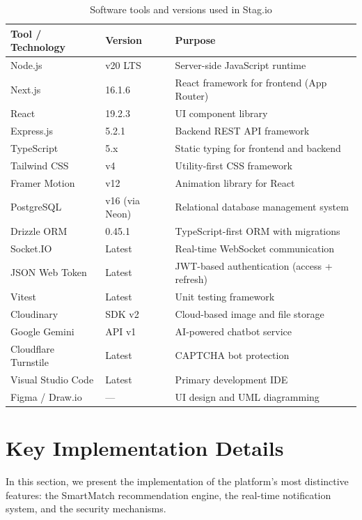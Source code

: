 \begin{table}[H]
\centering
\caption{Software tools and versions used in Stag.io}
\label{tab:software}
\begin{tabular}{|p{3.5cm}|p{2.5cm}|p{7.5cm}|}
\hline
\textbf{Tool / Technology} & \textbf{Version} & \textbf{Purpose} \\
\hline
Node.js & v20 LTS & Server-side JavaScript runtime \\
\hline
Next.js & 16.1.6 & React framework for frontend (App Router) \\
\hline
React & 19.2.3 & UI component library \\
\hline
Express.js & 5.2.1 & Backend REST API framework \\
\hline
TypeScript & 5.x & Static typing for frontend and backend \\
\hline
Tailwind CSS & v4 & Utility-first CSS framework \\
\hline
Framer Motion & v12 & Animation library for React \\
\hline
PostgreSQL & v16 (via Neon) & Relational database management system \\
\hline
Drizzle ORM & 0.45.1 & TypeScript-first ORM with migrations \\
\hline
Socket.IO & Latest & Real-time WebSocket communication \\
\hline
JSON Web Token & Latest & JWT-based authentication (access + refresh) \\
\hline
Vitest & Latest & Unit testing framework \\
\hline
Cloudinary & SDK v2 & Cloud-based image and file storage \\
\hline
Google Gemini & API v1 & AI-powered chatbot service \\
\hline
Cloudflare Turnstile & Latest & CAPTCHA bot protection \\
\hline
Visual Studio Code & Latest & Primary development IDE \\
\hline
Figma / Draw.io & --- & UI design and UML diagramming \\
\hline
\end{tabular}
\end{table}

\section{Key Implementation Details}

In this section, we present the implementation of the platform's most distinctive features: the SmartMatch recommendation engine, the real-time notification system, and the security mechanisms.

